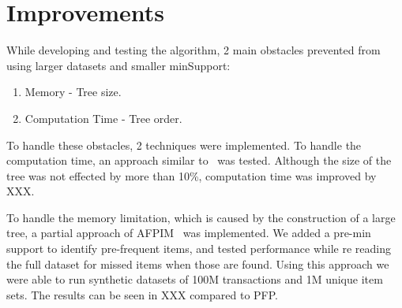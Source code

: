 \section{Improvements}
While developing and testing the algorithm, 2 main obstacles prevented from using larger datasets and smaller minSupport:
\begin{enumerate}
	\item Memory - Tree size.
	\item Computation Time - Tree order.
\end{enumerate}

To handle these obstacles, 2 techniques were implemented.
To handle the computation time, an approach similar to~\cite{tanbeer2009efficient} was tested. Although the size of the tree was not effected by more than 10\%, computation time was improved by XXX.

To handle the memory limitation, which is caused by the construction of a large tree, a partial approach of AFPIM~\cite{koh2004efficient} was implemented. We added a pre-min support to identify pre-frequent items, and tested performance while re reading the full dataset for missed items when those are found. 
Using this approach we were able to run synthetic datasets of 100M transactions and 1M unique item sets. The results can be seen in XXX compared to PFP.

